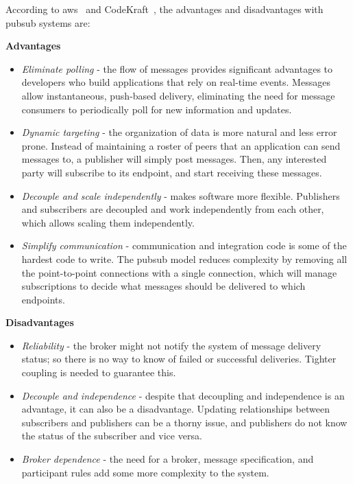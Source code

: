 According to \ac{aws}~\cite{aws_benefit} and CodeKraft~\cite{pubsub_codekraft}, the advantages and disadvantages with \ac{pubsub} systems are:

\textbf{Advantages}
\begin{itemize}
    \item \emph{Eliminate polling} - the flow of messages provides significant advantages to developers who build applications that rely on real-time events. Messages allow instantaneous, push-based delivery, eliminating the need for message consumers to periodically poll for new information and updates.
    
    \item \emph{Dynamic targeting} - the organization of data is more natural and less error prone. Instead of maintaining a roster of peers that an application can send messages to, a publisher will simply post messages. Then, any interested party will subscribe to its endpoint, and start receiving these messages.
    
    \item \emph{Decouple and scale independently} - makes software more flexible. Publishers and subscribers are decoupled and work independently from each other, which allows scaling them independently.
    
    \item \emph{Simplify communication} - communication and integration code is some of the hardest code to write. The \ac{pubsub} model reduces complexity by removing all the point-to-point connections with a single connection, which will manage subscriptions to decide what messages should be delivered to which endpoints.
\end{itemize}

\textbf{Disadvantages}
\begin{itemize}
    \item \emph{Reliability} -  the broker might not notify the system of message delivery status; so there is no way to know of failed or successful deliveries. Tighter coupling is needed to guarantee this.
    
    \item \emph{Decouple and independence} - despite that decoupling and independence is an advantage, it can also be a disadvantage. Updating relationships between subscribers and publishers can be a thorny issue, and publishers do not know the status of the subscriber and vice versa.
    
    \item \emph{Broker dependence} - the need for a broker, message specification, and participant rules add some more complexity to the system.
\end{itemize}

